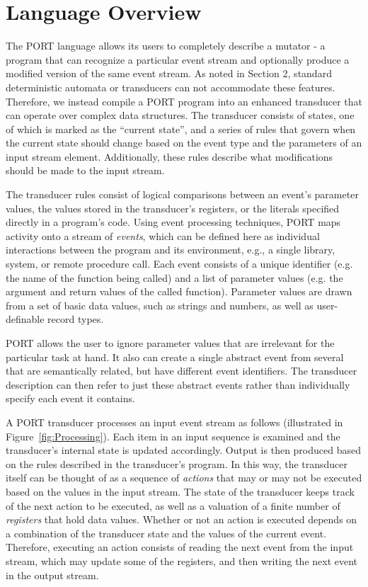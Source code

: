\section{Language Overview}
\label{sec:Overview}

The PORT language allows its users to completely describe a mutator - a program that can recognize a particular event stream and optionally produce a modified version of the same event stream.
As noted in Section 2, standard
deterministic automata or transducers can not accommodate these features.
Therefore, we instead compile a PORT program into
an  enhanced transducer that can operate over complex data structures.
The transducer consists of states, one of which is marked as the ``current state'', and
a series of rules that govern when the current state should change based on the event type
and the parameters of an input stream element.
Additionally, these rules describe what modifications should be made to the input stream.

The transducer rules consist of logical comparisons between an event's parameter values, the values stored in the transducer's registers, or the literals specified directly in a program's code.
Using event processing techniques, PORT maps activity onto a
stream of \emph{events}, which can be defined here as individual interactions between the program and its environment, e.g.,
a single library, system, or remote procedure call.
Each event consists of a unique identifier (e.g. the name of the function being called) and a list of parameter values (e.g. the argument and return values of the called function).
Parameter values are drawn from a set of basic data values, such as strings and numbers, as well as user-definable record types.

PORT allows the user to ignore parameter values that are irrelevant for the particular task at hand.  It also can create a single abstract event from several that are semantically related, but have different event identifiers. The transducer description can then refer to just these abstract events rather than individually specify each event it contains.

A PORT transducer processes an input event stream as follows (illustrated in Figure~\ref{fig:Processing}).
Each item in an input
sequence is examined and the transducer's internal state is updated accordingly.
 Output is then produced based on the rules described in the transducer's program.
 In this way, 
 the transducer itself can be thought of as a sequence of \emph{actions}
 that may or may not be executed based on the values in the input stream. 
 The state of the transducer keeps track of the next action to be executed, as well as a valuation of a 
 finite number of \emph{registers} that hold data values.
 Whether or not an action is executed depends on a combination of the transducer state
 and the values of the current event.
 Therefore, executing an action consists of reading the next
event from the input stream, which may update some of the registers, and then writing the next event in the output stream.

